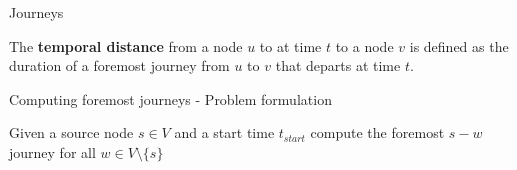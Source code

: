 \documentclass{beamer}
\begin{document}
\begin{frame}{Journeys}
	\begin{tcolorbox}[title=Definition: Temporal distance]
    The \textbf{temporal distance} from a node $u$ to at time $t$ to a node $v$ is defined as the duration of a foremost journey from $u$ to $v$ that departs at time $t$.
	\end{tcolorbox}
\end{frame}



\begin{frame}{Computing foremost journeys - Problem formulation}
  \begin{center}
    Given a source node $s \in V$ and a start time $t_{start}$ compute the foremost $s-w$ journey for all $w \in V \text{\textbackslash{}} \{ s \}$
  \end{center}
\end{frame}
\end{document}
